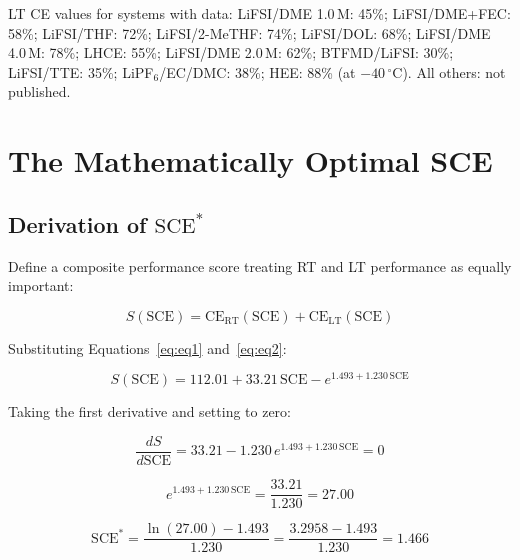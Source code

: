 \documentclass[12pt,letterpaper]{article}
\newcommand{\mSCE}{\mathrm{SCE}}
\newcommand{\mSCEstar}{\mathrm{SCE}^{*}}
\newcommand{\mCERT}{\mathrm{CE}_{\mathrm{RT}}}
\newcommand{\mCELT}{\mathrm{CE}_{\mathrm{LT}}}
\begin{document}
\noindent LT CE values for systems with data:
LiFSI/DME 1.0\,M: 45\%;
LiFSI/DME+FEC: 58\%;
LiFSI/THF: 72\%;
LiFSI/2-MeTHF: 74\%;
LiFSI/DOL: 68\%;
LiFSI/DME 4.0\,M: 78\%;
LHCE: 55\%;
LiFSI/DME 2.0\,M: 62\%;
BTFMD/LiFSI: 30\%;
LiFSI/TTE: 35\%;
LiPF$_{6}$/EC/DMC: 38\%;
HEE: 88\% (at $-40\,^{\circ}\mathrm{C}$).
All others: not published.

\section{The Mathematically Optimal SCE}
\label{sec:optimum}

\subsection{Derivation of $\mSCEstar$}
\label{sec:derive}

Define a composite performance score treating RT and LT
performance as equally important:

\begin{equation}
  S(\mSCE) = \mCERT(\mSCE) + \mCELT(\mSCE)
  \label{eq:score}
\end{equation}

Substituting Equations~\ref{eq:eq1} and~\ref{eq:eq2}:

\begin{equation}
  S(\mSCE) = 112.01 + 33.21\,\mSCE
             - e^{1.493 + 1.230\,\mSCE}
  \label{eq:scorefull}
\end{equation}

Taking the first derivative and setting to zero:

\begin{equation}
  \frac{dS}{d\mSCE}
  = 33.21 - 1.230\,e^{1.493 + 1.230\,\mSCE} = 0
  \label{eq:firstderiv}
\end{equation}

\begin{equation}
  e^{1.493 + 1.230\,\mSCE}
  = \frac{33.21}{1.230} = 27.00
  \label{eq:exponential}
\end{equation}

\begin{equation}
  \mSCEstar
  = \frac{\ln(27.00) - 1.493}{1.230}
  = \frac{3.2958 - 1.493}{1.230}
  = \boxed{1.466}
  \label{eq:scestar}
\end{equation}
\end{document}
